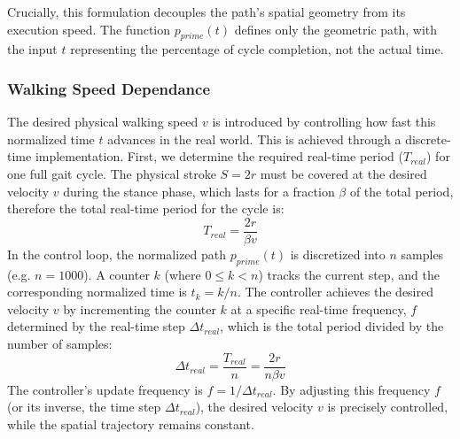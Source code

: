Crucially, this formulation decouples the path's spatial geometry from its execution speed.
The function $p_{prime}(t)$ defines only the geometric path, with the input $t$ representing the percentage
of cycle completion, not the actual time.


\subsubsection{Walking Speed Dependance}

The desired physical walking speed $v$ is introduced by controlling how fast this normalized time $t$ advances
in the real world. This is achieved through a discrete-time implementation. First, we determine the required
real-time period ($T_{real}$) for one full gait cycle. The physical stroke $S = 2r$ must be covered at the
desired velocity $v$ during the stance phase, which lasts for a fraction $\beta$ of the total period, therefore
the total real-time period for the cycle is:
$$ T_{real} = \frac{2r}{\beta v} $$
In the control loop, the normalized path $p_{prime}(t)$ is discretized into $n$ samples (e.g. $n = 1000$).
A counter $k$ (where $0 \le k < n$) tracks the current step, and the corresponding normalized time is $t_k = k/n$.
The controller achieves the desired velocity $v$ by incrementing the counter $k$ at a specific real-time
frequency, $f$ determined by the real-time step $\Delta t_{real}$, which is the total period divided by the
number of samples:
$$ \Delta t_{real} = \frac{T_{real}}{n} = \frac{2r}{n \beta v} $$
The controller's update frequency is $f = 1 / \Delta t_{real}$. By adjusting this frequency $f$ (or its inverse,
the time step $\Delta t_{real}$), the desired velocity $v$ is precisely controlled, while the spatial trajectory
remains constant.